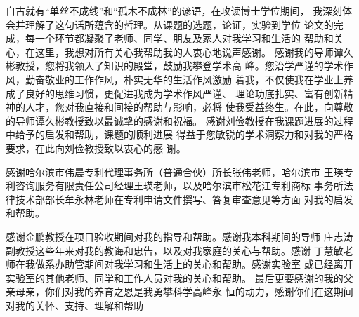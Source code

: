 \begin{thanks}
自古就有“单丝不成线”和“孤木不成林”的谚语，在攻读博士学位期间，
我深刻体会并理解了这句话所蕴含的哲理。从课题的选题，论证，实验到学位
论文的完成，每一个环节都凝聚了老师、同学、朋友及家人对我学习和生活的
帮助和关心，在这里，我想对所有关心我帮助我的人衷心地说声感谢。
感谢我的导师谭久彬教授，您将我领入了知识的殿堂，鼓励我攀登学术高
峰。您治学严谨的学术作风，勤奋敬业的工作作风，朴实无华的生活作风激励
着我，不仅使我在学业上养成了良好的思维习惯，更促进我成为学术作风严谨、
理论功底扎实、富有创新精神的人才，您对我直接和间接的帮助与影响，必将
使我受益终生。在此，向尊敬的导师谭久彬教授致以最诚挚的感谢和祝福。
感谢刘俭教授在我课题进展的过程中给予的启发和帮助，课题的顺利进展
得益于您敏锐的学术洞察力和对我的严格要求，在此向刘俭教授致以衷心的感
谢。

感谢哈尔滨市伟晨专利代理事务所（普通合伙）所长张伟老师，哈尔滨市
王瑛专利咨询服务有限责任公司经理王瑛老师，以及哈尔滨市松花江专利商标
事务所法律技术部部长牟永林老师在专利申请文件撰写、答复审查意见等方面
对我的启发和帮助。

感谢金鹏教授在项目验收期间对我的指导和帮助。感谢我本科期间的导师
庄志涛副教授这些年来对我的教诲和忠告，以及对我家庭的关心与帮助。感谢
丁慧敏老师在我做系办助管期间对我学习和生活上的关心和帮助。感谢实验室
或已经离开实验室的其他老师、同学和工作人员对我的关心和帮助。
最后更要感谢的我的父亲母亲，你们对我的养育之恩是我勇攀科学高峰永
恒的动力，感谢你们在这期间对我的关怀、支持、理解和帮助

\end{thanks}